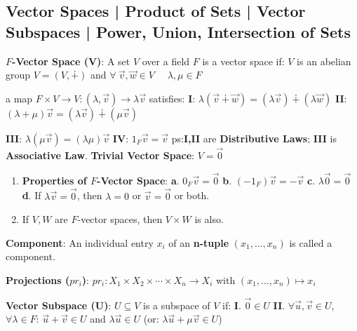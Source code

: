\documentclass[9pt]{article}
\begin{document}
\subsection{Vector Spaces | Product of Sets | Vector Subspaces | Power, Union, Intersection of Sets}

\textbf{$F$-Vector Space (V)}: A set $V$ over a field $F$ is a vector space if: \quad $V$ is an abelian group $V=(V,\dotplus)$ and $\forall \ \vec{v},\vec{w}\in V$ \ \ $\lambda,\mu\in F$

\quad \quad \quad \quad a map $F\times V\to V:(\lambda,\vec{v})\to\lambda\vec{v}$ satisfies: \textbf{I}: $\lambda(\vec{v}\dotplus\vec{w})=(\lambda\vec{v})\dotplus(\lambda\vec{w})$ \quad \textbf{II}: $(\lambda+\mu)\vec{v}=(\lambda\vec{v})\dotplus(\mu\vec{v})$

\quad \quad \quad \quad \textbf{III}: $\lambda(\mu\vec{v})=(\lambda\mu)\vec{v}$ \quad \textbf{IV}: $1_F\vec{v}=\vec{v}$ \hspace{30pt} {\scriptsize ps:\textbf{I,II} are \textbf{Distributive Laws}; \textbf{III} is \textbf{Associative Law}. \hspace{30pt} \textbf{Trivial Vector Space}: $V=\vec{0}$}

\begin{enumerate}[itemsep=-2pt, topsep=-2pt]
    \item \textbf{Properties of $F$-Vector Space}: \textbf{a}. $0_F\vec{v}=\vec{0}$ \quad \textbf{b}. $(-1_F)\vec{v}=-\vec{v}$ \quad \textbf{c}. $\lambda\vec{0}=\vec{0}$ \quad \textbf{d}. If $\lambda\vec{v}=\vec{0}$, then $\lambda=0$ or $\vec{v}=\vec{0}$ or both.
    \item If $V,W$ are $F$-vector spaces, then $V\times W$ is also.
\end{enumerate}

\textbf{Component}: An individual entry $x_i$ of an \textbf{n-tuple} $(x_1,...,x_n)$ is called a component.

\textbf{Projections ($pr_i$)}: $pr_i:X_1\times X_2\times\cdots\times X_n \to X_i$ with $(x_1,...,x_n)\mapsto x_i$

\textbf{Vector Subspace (U)}: $U\subseteq V$ is a subspace of $V$ if: \quad \textbf{I}. $\vec{0}\in U$ \quad \textbf{II}. $\forall \vec{u},\vec{v}\in U$, $\forall \lambda\in F$: $\vec{u}+\vec{v}\in U$ and $\lambda\vec{u}\in U$ \quad (or: $\lambda\vec{u}+\mu\vec{v}\in U$)
\end{document}
